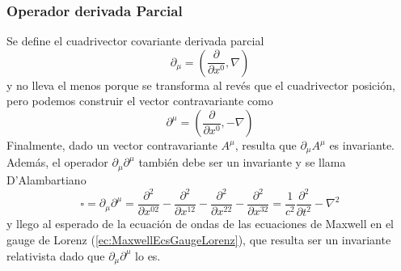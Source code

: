 \subsubsection{Operador derivada Parcial}
Se define el cuadrivector covariante derivada parcial
\begin{equation*}
    \partial_{\mu} = 
    \left(
        \frac{\partial}{\partial x^{0}}, \nabla
    \right)
\end{equation*}
y no lleva el menos porque se transforma al revés que el cuadrivector posición, pero podemos construir el vector contravariante como
\begin{equation*}
    \partial^{\mu} = 
    \left(
        \frac{\partial}{\partial x^{0}}, -\nabla
    \right)
\end{equation*}
Finalmente, dado un vector contravariante $A^{\mu}$, resulta que $\partial_{\mu}A^{\mu}$ es invariante. Además, el operador $\partial_{\mu}\partial^{\mu}$ también debe ser un invariante y se llama D'Alambartiano
\begin{equation*}
    \square = \partial_{\mu}\partial^{\mu} =
    \frac{\partial^{2}}{\partial x^{02}} -
    \frac{\partial^{2}}{\partial x^{12}} -
    \frac{\partial^{2}}{\partial x^{22}} -
    \frac{\partial^{2}}{\partial x^{32}} =
    \frac{1}{c^{2}}\frac{\partial^{2}}{\partial t^{2}} - \nabla^{2}
\end{equation*}
y llego al esperado de la ecuación de ondas de las ecuaciones de Maxwell en el gauge de Lorenz (\eqref{ec:MaxwellEcsGaugeLorenz}), que resulta ser un invariante relativista dado que $\partial_{\mu}\partial^{\mu}$ lo es.



